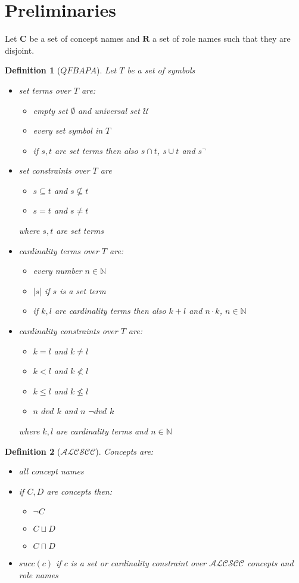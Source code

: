 \documentclass[a4paper,11pt]{scrartcl}
\theoremstyle{break}
\newtheorem{mydef}{Definition}
\begin{document}
\section{Preliminaries}
Let $\mathbf{C}$ be a set of concept names and $\mathbf{R}$ a set of role names such that they are disjoint.
\begin{mydef}[$QFBAPA$]
Let $T$ be a set of symbols
\begin{itemize}
\item set terms over $T$ are:
\begin{itemize}
\item empty set $\emptyset$ and universal set $
\mathcal{U}$
\item every set symbol in $T$
\item if $s,t$ are set terms then also $s\cap t$, $s\cup t$ and $s^{\neg}$
\end{itemize}
\item set constraints over $T$ are
\begin{itemize}
\item $s\subseteq t$ and $s\not\subseteq t$
\item $s=t$ and $s\neq t$
\end{itemize}
where $s,t$ are set terms
\item cardinality terms over $T$ are:
\begin{itemize}
\item every number $n\in \mathbb{N}$
\item $|s|$ if $s$ is a set term
\item if $k,l$ are cardinality terms then also $k+l$ and $n\cdot k$, $n\in \mathbb{N}$
\end{itemize}
\item cardinality constraints over $T$ are:
\begin{itemize}
\item $k=l$ and $k\neq l$
\item $k<l$ and $k\nless l$
\item $k\leq l$ and $k\not\leq l$
\item $n$ $dvd$ $k$ and $n$ $\neg dvd$ $k$
\end{itemize}
where $k,l$ are cardinality terms and $n\in\mathbb{N}$
\end{itemize}
\end{mydef}
\begin{mydef}[$\mathcal{ALCSCC}$]
Concepts are:
\begin{itemize}
\item all concept names
\item if $C,D$ are concepts then:
\begin{itemize}
\item $\neg C$
\item $C\sqcup D$
\item $C\sqcap D$
\end{itemize}
\item $succ(c)$ if $c$ is a set or cardinality constraint over $\mathcal{ALCSCC}$ concepts and role names
\end{itemize}
\end{mydef}
\end{document}

